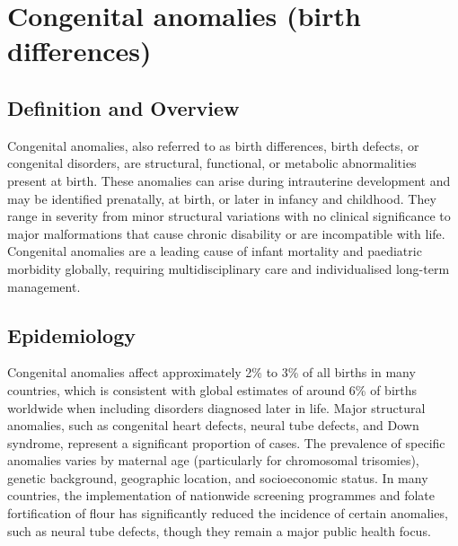 \chapter{Congenital anomalies (birth differences)}

\section*{Definition and Overview}
Congenital anomalies, also referred to as birth differences, birth defects, or congenital disorders, are structural, functional, or metabolic abnormalities present at birth. These anomalies can arise during intrauterine development and may be identified prenatally, at birth, or later in infancy and childhood. They range in severity from minor structural variations with no clinical significance to major malformations that cause chronic disability or are incompatible with life. Congenital anomalies are a leading cause of infant mortality and paediatric morbidity globally, requiring multidisciplinary care and individualised long-term management.

\section*{Epidemiology}
Congenital anomalies affect approximately 2\% to 3\% of all births in many countries, which is consistent with global estimates of around 6\% of births worldwide when including disorders diagnosed later in life. Major structural anomalies, such as congenital heart defects, neural tube defects, and Down syndrome, represent a significant proportion of cases. The prevalence of specific anomalies varies by maternal age (particularly for chromosomal trisomies), genetic background, geographic location, and socioeconomic status. In many countries, the implementation of nationwide screening programmes and folate fortification of flour has significantly reduced the incidence of certain anomalies, such as neural tube defects, though they remain a major public health focus.

